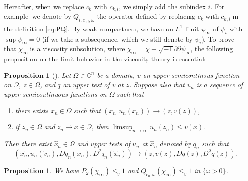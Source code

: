 \documentclass{amsart}
\numberwithin{equation}{section}
\theoremstyle{plain}
\newtheorem{prop}[equation]{Proposition}
\theoremstyle{definition}
\theoremstyle{remark}
\newcommand{\delb}{\sqrt{-1}\partial\bar{\partial}}
\begin{document}
    Hereafter, when we replace $c_k$ with $c_{k,i}$, we simply add the subindex $i$. For example, we denote by $Q_{i,c_{0,i},\omega}$ the operator defined by replacing $c_k$ with $c_{k,i}$ in the definition \eqref{eq:PQ}. 
    By weak compactness, we have an $L^1$-limit $\psi_\infty$ of $\psi_i$ with $\sup{\psi_\infty}=0$ (if we take a subsequence, which we still denote by $\psi_i$). To prove that $\chi_\infty$ is a viscosity subsolution, where $\chi_\infty=\chi+\delb\psi_\infty$, the following proposition on the limit behavior in the viscosity theory is essential:

\begin{prop}[{\cite[Proposition 4.3]{CIL}}]\label{propCIL}
    Let $\Omega \in \mathbb{C}^n$ be a domain, $v$ an upper semicontinous function on $\Omega$, $z \in \Omega$, and $q$ an upper test of $v$ at $z$. Suppose also that $u_n$ is a sequence of upper semicontinuous functions on $\Omega$ such that
    \begin{enumerate}[label={\upshape(\roman*)}]
        \item\label{itemCIL1} there exists $x_n \in \Omega$ such that $(x_n,u_n(x_n)) \rightarrow (z,v(z))$,
        \item\label{itemCIL2} if $z_n \in \Omega$ and $z_n \rightarrow x\in\Omega$, then $\limsup_{n\rightarrow\infty}u_n(z_n)\le v(x)$.
    \end{enumerate}
    Then there exist $\hat{x}_n\in \Omega$ and upper tests of $u_n$ at $\hat{x}_n$ denoted by $q_n$ such that
    $$(\hat{x}_n,u_n(\hat{x}_n),Dq_n(\hat{x}_n),D^2q_n(\hat{x}_n))\rightarrow(z,v(z),Dq(z),D^2q(z)).$$
\end{prop}

\begin{prop}\label{prop:vsub}
    We have $P_\omega(\chi_\infty)\le_v 1$ and $Q_{c_0,\omega}(\chi_\infty)\le_v 1$ in $\{\omega>0\}$.
\end{prop}
\end{document}
